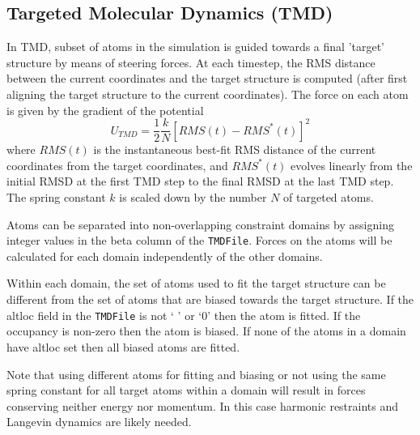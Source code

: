 \subsection{Targeted Molecular Dynamics (TMD)}

In TMD, subset of atoms in the simulation is guided towards a 
final 'target' structure by means of steering forces.  At each timestep, 
the RMS distance between
the current coordinates and the target structure is computed (after
first aligning the target structure to the current coordinates).
The force on each atom is given by the gradient of the potential
\begin{equation}
U_{TMD} = \frac{1}{2} \frac{k}{N} \left[ RMS(t) - RMS^*(t) \right]^2
\label{eq:tmdpotential}
\end{equation}
where $RMS(t)$ is the instantaneous best-fit RMS distance of the current
coordinates from the target coordinates, and $RMS^*(t)$ evolves linearly
from the initial RMSD at the first TMD step to the final RMSD at the last 
TMD step.  The spring constant $k$ is scaled down by the number $N$ of targeted
atoms.

Atoms can be separated into non-overlapping constraint domains by
assigning integer values in the beta column of the {\tt TMDFile}.  Forces on
the atoms will be calculated for each domain independently of the other domains.

Within each domain, the set of atoms used to fit the target structure can be
different from the set of atoms that are biased towards the target structure.
If the altloc field in the {\tt TMDFile} is not ` ' or `0' then the atom is fitted.
If the occupancy is non-zero then the atom is biased.
If none of the atoms in a domain have altloc set then all biased atoms are fitted.

Note that using different atoms for fitting and biasing
or not using the same spring constant for all target atoms within
a domain will result in forces conserving neither energy nor momentum.
In this case harmonic restraints and Langevin dynamics are likely needed.


